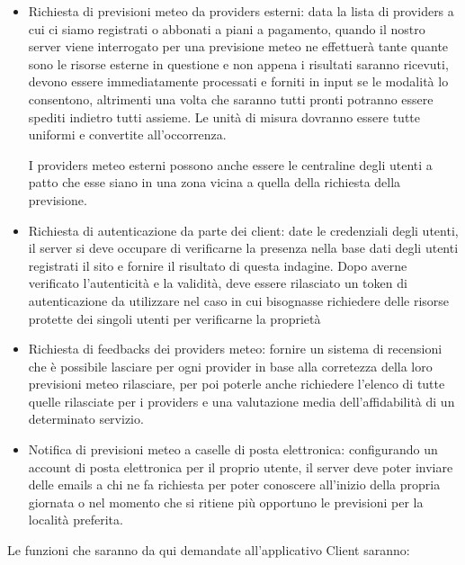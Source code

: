    \begin{itemize}
    
        \item Richiesta di previsioni meteo da providers esterni: data la lista di providers a cui ci siamo registrati o abbonati a piani a pagamento, quando il nostro server viene interrogato per una previsione meteo ne effettuerà tante quante sono le risorse esterne in questione e non appena i risultati saranno ricevuti, devono essere immediatamente processati e forniti in input se le modalità lo consentono, altrimenti una volta che saranno tutti pronti potranno essere spediti indietro tutti assieme. Le unità di misura dovranno essere tutte uniformi e convertite all'occorrenza.
        
        \par I providers meteo esterni possono anche essere le centraline degli utenti a patto che esse siano in una zona vicina a quella della richiesta della previsione.
        
        \item Richiesta di autenticazione da parte dei client: date le credenziali degli utenti, il server si deve occupare di verificarne la presenza nella base dati degli utenti registrati il sito e fornire il risultato di questa indagine. Dopo averne verificato l'autenticità e la validità, deve essere rilasciato un token di autenticazione da utilizzare nel caso in cui bisognasse richiedere delle risorse protette dei singoli utenti per verificarne la proprietà
        
        \item Richiesta di feedbacks dei providers meteo: fornire un sistema di recensioni che è possibile lasciare per ogni provider in base alla corretezza della loro previsioni meteo rilasciare, per poi poterle anche richiedere l'elenco di tutte quelle rilasciate per i providers e una valutazione media dell'affidabilità di un determinato servizio.
        
        \item Notifica di previsioni meteo a caselle di posta elettronica: configurando un account di posta elettronica per il proprio utente, il server deve poter inviare delle emails a chi ne fa richiesta per poter conoscere all'inizio della propria giornata o nel momento che si ritiene più opportuno le previsioni per la località preferita.
        
    \end{itemize}
    
    \par Le funzioni che saranno da qui demandate all'applicativo Client saranno:
    
